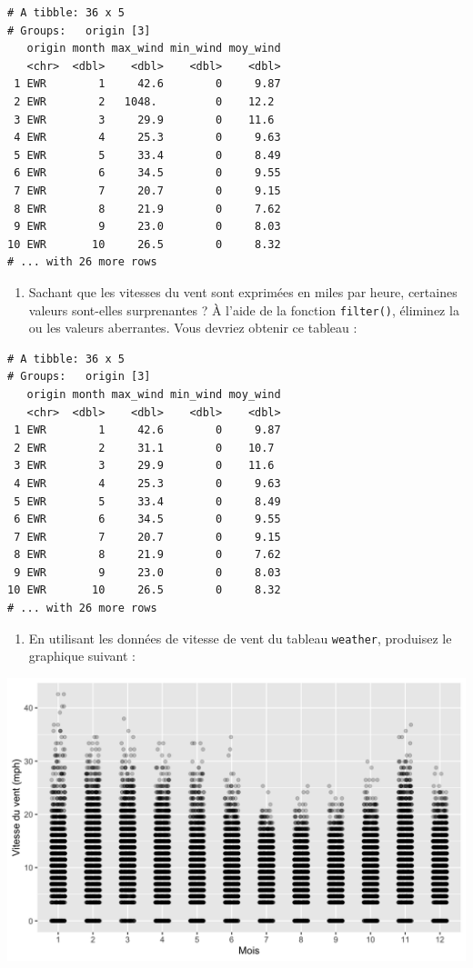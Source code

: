 \documentclass[a4paperpaper,]{article}
\providecommand{\tightlist}{%
  \setlength{\itemsep}{0pt}\setlength{\parskip}{0pt}}
\begin{document}
\begin{verbatim}
# A tibble: 36 x 5
# Groups:   origin [3]
   origin month max_wind min_wind moy_wind
   <chr>  <dbl>    <dbl>    <dbl>    <dbl>
 1 EWR        1     42.6        0     9.87
 2 EWR        2   1048.         0    12.2 
 3 EWR        3     29.9        0    11.6 
 4 EWR        4     25.3        0     9.63
 5 EWR        5     33.4        0     8.49
 6 EWR        6     34.5        0     9.55
 7 EWR        7     20.7        0     9.15
 8 EWR        8     21.9        0     7.62
 9 EWR        9     23.0        0     8.03
10 EWR       10     26.5        0     8.32
# ... with 26 more rows
\end{verbatim}

\begin{enumerate}
\def\labelenumi{\arabic{enumi}.}
\setcounter{enumi}{2}
\tightlist
\item
  Sachant que les vitesses du vent sont exprimées en miles par heure, certaines valeurs sont-elles surprenantes ? À l'aide de la fonction \texttt{filter()}, éliminez la ou les valeurs aberrantes. Vous devriez obtenir ce tableau :
\end{enumerate}

\begin{verbatim}
# A tibble: 36 x 5
# Groups:   origin [3]
   origin month max_wind min_wind moy_wind
   <chr>  <dbl>    <dbl>    <dbl>    <dbl>
 1 EWR        1     42.6        0     9.87
 2 EWR        2     31.1        0    10.7 
 3 EWR        3     29.9        0    11.6 
 4 EWR        4     25.3        0     9.63
 5 EWR        5     33.4        0     8.49
 6 EWR        6     34.5        0     9.55
 7 EWR        7     20.7        0     9.15
 8 EWR        8     21.9        0     7.62
 9 EWR        9     23.0        0     8.03
10 EWR       10     26.5        0     8.32
# ... with 26 more rows
\end{verbatim}

\begin{enumerate}
\def\labelenumi{\arabic{enumi}.}
\setcounter{enumi}{3}
\tightlist
\item
  En utilisant les données de vitesse de vent du tableau \texttt{weather}, produisez le graphique suivant :
\end{enumerate}

\begin{center}\includegraphics[width=0.9\linewidth]{figure/windspeed-1} \end{center}
\end{document}
